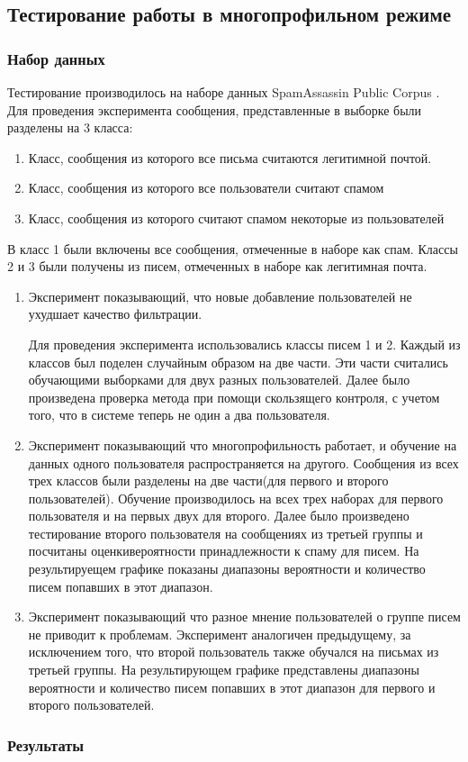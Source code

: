 \subsection{Тестирование работы в многопрофильном режиме}

\subsubsection{Набор данных}
Тестирование производилось на наборе данных SpamAssassin Public Corpus \cite{SAPC}.
Для проведения эксперимента сообщения, представленные в выборке были разделены на 3 класса:
\begin{enumerate}
\item Класс, сообщения из которого все письма считаются легитимной почтой.
\item Класс, сообщения из которого все пользователи считают спамом
\item Класс, сообщения из которого считают спамом некоторые из пользователей
\end{enumerate}

В класс 1 были включены все сообщения, отмеченные в наборе \cite{SAPC} как спам. Классы 2 и 3 были получены из писем, отмеченных в наборе \cite{SAPC} как легитимная почта.
\begin{enumerate}
	\item Эксперимент показывающий, что новые добавление пользователей не ухудшает качество фильтрации.

	Для проведения эксперимента использовались классы писем 1 и 2. Каждый из классов был поделен случайным образом на две части. Эти части считались обучающими выборками для двух разных пользователей. Далее было произведена проверка метода при помощи скользящего контроля, с учетом того, что в системе теперь не один а два пользователя.

	\item Эксперимент показывающий что многопрофильность работает, и обучение на данных одного пользователя распространяется на другого. Сообщения из всех трех классов были разделены на две части(для первого и второго пользователей). Обучение производилось на всех трех наборах для первого пользователя и на первых двух для второго. Далее было произведено тестирование второго пользователя на сообщениях из третьей группы и посчитаны оценкивероятности принадлежности к спаму для писем. На результируещем графике показаны диапазоны вероятности и количество писем попавших в этот диапазон.

	\item Эксперимент показывающий что разное мнение пользователей о группе писем не приводит к проблемам. Эксперимент аналогичен предыдущему, за исключением того, что второй пользователь также обучался на письмах из третьей группы. На результирующем графике представлены диапазоны вероятности и количество писем попавших в этот диапазон для первого и второго пользователей. 
	
\end{enumerate}
\subsubsection{Результаты}

